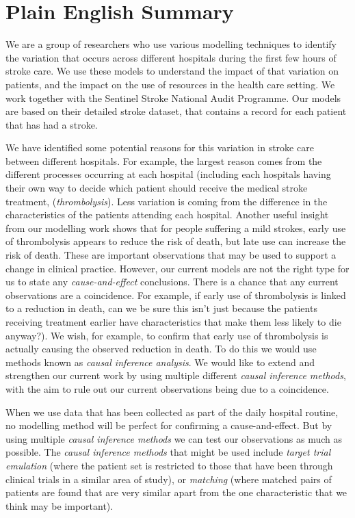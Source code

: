\section*{Plain English Summary}

We are a group of researchers who use various modelling techniques to identify the variation that occurs across different hospitals during the first few hours of stroke care. We use these models to understand the impact of that variation on patients, and the impact on the use of resources in the health care setting. We work together with the Sentinel Stroke National Audit Programme. Our models are based on their detailed stroke dataset, that contains a record for each patient that has had a stroke.

We have identified some potential reasons for this variation in stroke care between different hospitals. For example, the largest reason comes from the different processes occurring at each hospital (including each hospitals having their own way to decide which patient should receive the medical stroke treatment, (\textit{thrombolysis}). Less variation is coming from the difference in the characteristics of the patients attending each hospital. Another useful insight from our modelling work shows that for people suffering a mild strokes, early use of thrombolysis appears to reduce the risk of death, but late use can increase the risk of death. These are important observations that may be used to support a change in clinical practice. However, our current models are not the right type for us to state any \textit{cause-and-effect} conclusions. There is a chance that any current observations are a coincidence. For example, if early use of thrombolysis is linked to a reduction in death, can we be sure this isn't just because the patients receiving treatment earlier have characteristics that make them less likely to die anyway?). We wish, for example, to confirm that early use of thrombolysis is actually causing the observed reduction in death. To do this we would use methods known as \textit{causal inference analysis}. We would like to extend and strengthen our current work by using multiple different \textit{causal inference methods}, with the aim to rule out our current observations being due to a coincidence.

When we use data that has been collected as part of the daily hospital routine, no modelling method will be perfect for confirming a cause-and-effect. But by using multiple \textit{causal inference methods} we can test our observations as much as possible. The \textit{causal inference methods} that might be used include \textit{target trial emulation} (where the patient set is restricted to those that have been through clinical trials in a similar area of study), or \textit{matching} (where matched pairs of patients are found that are very similar apart from the one characteristic that we think may be important).

